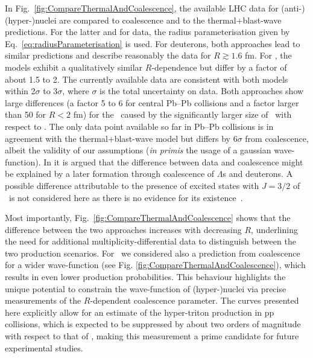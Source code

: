 \documentclass[%
 reprint,
 amsmath,amssymb,
 aps,
]{revtex4-1}
\begin{document}
In Fig.~\ref{fig:CompareThermalAndCoalescence}, the available LHC data for \mbox{(anti-)(hyper-)nuclei} \cite{ALICE:nucleipp2017,ALICE:deuteronppPbPb2015,Adam:2015yta} are compared to coalescence and to the thermal+blast-wave predictions.
For the latter and for data, the radius parameterisation given by Eq.~\ref{eq:radiusParameterisation} is used.
For deuterons, both approaches lead to similar predictions and describe reasonably the data for $R \gtrsim 1.6$ fm. 
For \hethree, the models exhibit a qualitatively similar $R$-dependence but differ by a factor of about 1.5 to 2. 
The currently available data are consistent with both models within 2$\sigma$ to 3$\sigma$, where $\sigma$ is the total uncertainty on data. 
Both approaches show large differences (a factor 5 to 6 for central Pb--Pb collisions and a factor larger than 50 for $R < 2$ fm) for the \hthreelambda\ caused by the significantly larger size of \hthreelambda\ with respect to \hethree. 
The only data point available so far in Pb--Pb collisions is in agreement with the thermal+blast-wave model but differs by 6$\sigma$ from coalescence, albeit the validity of our assumptions (\textit{in primis} the usage of a gaussian wave-function).
In \cite{Zhang:2018euf} it is argued that the difference between data and coalescence might be explained by a later formation through coalescence of $\Lambda$s and deuterons. 
A possible difference attributable to the presence of excited states with $J=3/2$ of \hthreelambda~is not considered here as there is no evidence for its existence~\cite{Mart:1996ay}. 

Most importantly, Fig.~\ref{fig:CompareThermalAndCoalescence} shows that the difference between the two approaches increases with decreasing $R$, underlining the need for additional multiplicity-differential data to distinguish between the two production scenarios. 
For \hthreelambda~we considered also a prediction from coalescence for a wider wave-function (see Fig. \ref{fig:CompareThermalAndCoalescence}), which results in even lower production probabilities. This behaviour highlights the unique potential to constrain the wave-function of (hyper-)nuclei via precise measurements of the $R$-dependent coalescence parameter. 
The curves presented here explicitly allow for an estimate of the hyper-triton production in pp collisions, which is expected to be suppressed by about two orders of magnitude with respect to that of \hethree, making this measurement a prime candidate for future experimental studies.
\end{document}
